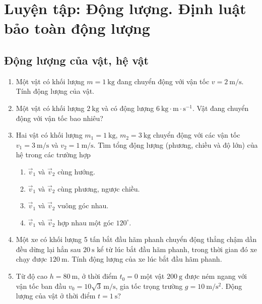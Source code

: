 \chapter{Luyện tập: Động lượng. Định luật bảo toàn động lượng}
\section{Động lượng của vật, hệ vật}
\begin{enumerate}
	\item %
	Một vật có khối lượng $m=\SI{1}{\kilogram}$ đang chuyển động với vận tốc $v=\SI{2}{\meter/\second}$. Tính động lượng của vật.
	\item %
	Một vật có khối lượng $\SI{2}{\kilogram}$ và có động lượng $\SI{6}{\kilogram\cdot\meter\cdot\second^{-1}}$. Vật đang chuyển động với vận tốc bao nhiêu?
	\item %
	Hai vật có khối lượng $m_1=\SI{1}{\kilogram}$, $m_2=\SI{3}{\kilogram}$ chuyển động với các vận tốc $v_1=\SI{3}{\meter/\second}$ và $v_2=\SI{1}{\meter/\second}$. Tìm tổng động lượng (phương, chiều và độ lớn) của hệ trong các trường hợp
	\begin{enumerate}[label=\alph*)]
		\item $\vec{v}_1$ và $\vec{v}_2$ cùng hướng.
		\item $\vec{v}_1$ và $\vec{v}_2$ cùng phương, ngược chiều.
		\item $\vec{v}_1$ và $\vec{v}_2$ vuông góc nhau.
		\item $\vec{v}_1$ và $\vec{v}_2$ hợp nhau một góc $120^\circ$.
	\end{enumerate}
	\item %
	Một xe có khối lượng 5 tấn bắt đầu hãm phanh chuyển động thẳng chậm dần đều dừng lại hẳn sau $\SI{20}{\second}$ kể từ lúc bắt đầu hãm phanh, trong thời gian đó xe chạy được $\SI{120}{\meter}$. Tính động lượng của xe lúc bắt đầu hãm phanh.
	\item %
	Từ độ cao $h=\SI{80}{\meter}$, ở thời điểm $t_0=0$ một vật $\SI{200}{\gram}$ được ném ngang với vận tốc ban đầu $v_0=10\sqrt{3}\,\text{m/s}$, gia tốc trọng trường $g=\SI{10}{\meter/\second^2}$. Động lượng của vật ở thời điểm $t=\SI{1}{\second}$?
\end{enumerate}


